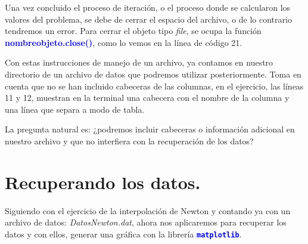 \documentclass[12pt]{article}
\newcommand{\azulfuerte}[1]{\textcolor{blue}{\textbf{#1}}}
\begin{document}
\par
Una vez concluido el proceso de iteración, o el proceso donde se calcularon los valores del problema, se debe de cerrar el espacio del archivo, o de lo contrario tendremos un error. Para cerrar el objeto tipo \emph{file}, se ocupa la función \azulfuerte{nombreobjeto.close()}, como lo vemos en la línea de código 21.
\par
Con estas instrucciones de manejo de un archivo, ya contamos en nuestro directorio de un archivo de datos que podremos utilizar posteriormente. Toma en cuenta que no se han incluido cabeceras de las columnas, en el ejercicio, las líneas 11 y 12, muestran en la terminal una cabecera con el nombre de la columna y una línea que separa a modo de tabla.
\par
La pregunta natural es: ¿podremos incluir cabeceras o información adicional en nuestro archivo y que no interfiera con la recuperación de los datos?
\section{Recuperando los datos.}
Siguiendo con el ejercicio de la interpolación de Newton y contando ya con un archivo de datos: \emph{DatosNewton.dat}, ahora nos aplicaremos para recuperar los datos y con ellos, generar una gráfica con la librería \azulfuerte{\texttt{matplotlib}}.
\end{document}
